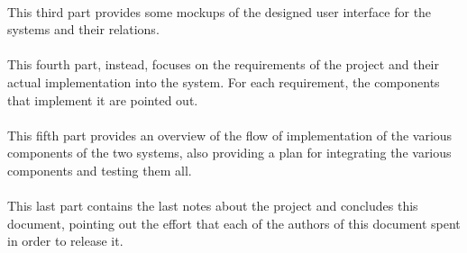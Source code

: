 \paragraph{} This third part provides some mockups of the designed user interface for the systems and their relations.

\paragraph{} This fourth part, instead, focuses on the requirements of the project and their actual implementation into the system. For each requirement, the components that implement it are pointed out.

\paragraph{} This fifth part provides an overview of the flow of implementation of the various components of the two systems, also providing a plan for integrating the various components and testing them all.

\paragraph{} This last part contains the last notes about the project and concludes this document, pointing out the effort that each of the authors of this document spent in order to release it.
